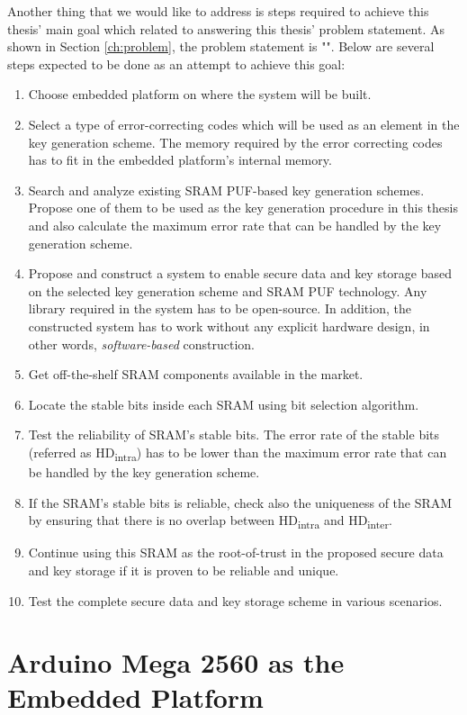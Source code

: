 Another thing that we would like to address is steps required to achieve this thesis' main goal which related to answering this thesis' problem statement. As shown in Section \ref{ch:problem}, the problem statement is "\problemStatement".
Below are several steps expected to be done as an attempt to achieve this goal:
\begin{enumerate}
  \item Choose embedded platform on where the system will be built.
  \item Select a type of error-correcting codes which will be used as an element in the key generation scheme. The memory required by the error correcting codes has to fit in the embedded platform's internal memory.
  \item Search and analyze existing SRAM PUF-based key generation schemes. Propose one of them to be used as the key generation procedure in this thesis and also calculate the maximum error rate that can be handled by the key generation scheme.
  \item Propose and construct a system to enable secure data and key storage based on the selected key generation scheme and SRAM PUF technology. Any library required in the system has to be open-source. In addition, the constructed system has to work without any explicit hardware design, in other words, \textit{software-based} construction.
  \item Get off-the-shelf SRAM components available in the market.
  \item Locate the stable bits inside each SRAM using bit selection algorithm.
  \item Test the reliability of SRAM's stable bits. The error rate of the stable bits (referred as HD\textsubscript{intra}) has to be lower than the maximum error rate that can be handled by the key generation scheme.
  \item If the SRAM's stable bits is reliable, check also the uniqueness of the SRAM by ensuring that there is no overlap between HD\textsubscript{intra} and HD\textsubscript{inter}.
  \item Continue using this SRAM as the root-of-trust in the proposed secure data and key storage if it is proven to be reliable and unique.
  \item Test the complete secure data and key storage scheme in various scenarios.
\end{enumerate}

\section{Arduino Mega 2560 as the Embedded Platform}

